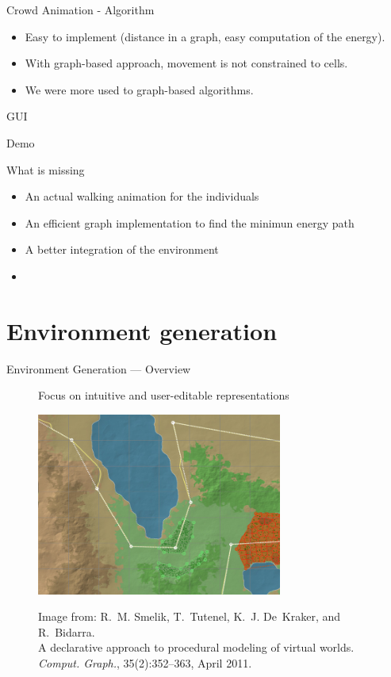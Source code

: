 \documentclass{beamer}
\begin{document}
\begin{frame}{Crowd Animation - Algorithm}
\begin{itemize}
  \item Easy to implement (distance in a graph, easy computation of the energy).
  \item With graph-based approach, movement is not constrained to cells.
  \item We were more used to graph-based algorithms.
\end{itemize}
\end{frame}

\begin{frame}{GUI}


\end{frame}

\begin{frame}{Demo}
\end{frame}

\begin{frame}{What is missing}
  \begin{itemize}
  \item An actual walking animation for the individuals
  \item An efficient graph implementation to find the minimun energy path
  \item A better integration of the environment
  \item 
  \end{itemize}
\end{frame}

\section{Environment generation}
\begin{frame}{Environment Generation --- Overview}
  \begin{figure}
    \begin{center}
      Focus on intuitive and user-editable representations

      \includegraphics[height=6cm]{input_map.png}

      \tiny
      Image from: %
      R.~M. Smelik, T.~Tutenel, K.~J. De~Kraker, and R.~Bidarra. \\
      A declarative approach to procedural modeling of virtual worlds. \\
      \emph{Comput. Graph.}, 35(2):352--363, April 2011.
    \end{center}
  \end{figure}
\end{frame}
\end{document}
